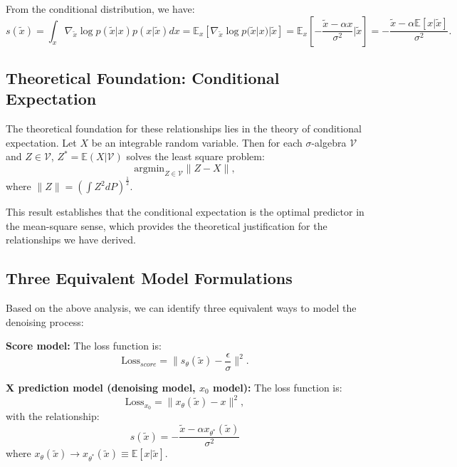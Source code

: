 From the conditional distribution, we have:
\begin{equation}
s(\tilde{x}) = \int_x \nabla_{\tilde{x}} \log p(\tilde{x}|x)p(x|\tilde{x})dx = \mathbb{E}_x[\nabla_{\tilde{x}} \log p(\tilde{x}|x)| \tilde{x}] = \mathbb{E}_x\left[-\frac{\tilde{x}-\alpha x}{\sigma^2}| \tilde{x}\right] = -\frac{\tilde{x}-\alpha \mathbb{E}[x|\tilde{x}]}{\sigma^2}.
\end{equation}

\subsection{Theoretical Foundation: Conditional Expectation}

The theoretical foundation for these relationships lies in the theory of conditional expectation. Let $X$ be an integrable random variable. Then for each $\sigma$-algebra $\mathcal{V}$ and $Z \in \mathcal{V}$, $Z^* = \mathbb{E}(X| \mathcal{V})$ solves the least square problem:
\begin{equation}
\text{argmin}_{Z\in \mathcal{V}} \| Z - X\|,
\end{equation}
where $\| Z\| = \left( \int Z^2 dP \right)^{\frac{1}{2}}$.

This result establishes that the conditional expectation is the optimal predictor in the mean-square sense, which provides the theoretical justification for the relationships we have derived.

\subsection{Three Equivalent Model Formulations}

Based on the above analysis, we can identify three equivalent ways to model the denoising process:

\textbf{Score model:} The loss function is:
\begin{equation}
\text{Loss}_{score} = \|s_\theta(\tilde{x}) - \frac{\epsilon}{\sigma}\|^2.
\end{equation}

\textbf{X prediction model (denoising model, $x_0$ model):} The loss function is:
\begin{equation}
\text{Loss}_{x_0} = \|x_\theta (\tilde{x}) - x\|^2,
\end{equation}
with the relationship:
\begin{equation}
s(\tilde{x}) = -\frac{\tilde{x}-\alpha x_{\theta^*} (\tilde{x})}{\sigma^2}
\end{equation}
where $x_\theta(\tilde{x}) \to x_{\theta^*}(\tilde{x}) \equiv \mathbb{E}[x|\tilde{x}]$.

